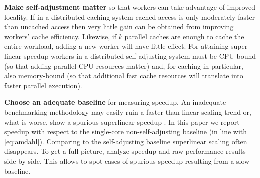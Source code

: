 \noindent%
\textbf{Make self-adjustment matter} so that workers can take advantage of improved locality. If in a distributed caching system cached access is only moderately faster than uncached access then very little gain can be obtained from improving workers' cache efficiency. Likewise, if $k$ parallel caches are enough to cache the entire workload, adding a new worker will have little effect. For attaining super-linear speedup workers in a distributed self-adjusting system must be CPU-bound (so that adding parallel CPU resources matter) and, for caching in particular, also memory-bound (so that additional fast cache resources will translate into faster parallel execution).

\noindent%
\textbf{Choose an adequate baseline} for measuring speedup. An inadequate benchmarking methodology may easily ruin a faster-than-linear scaling trend or, what is worse, show a spurious superlinear speedup \cite{10.1145/2773212.2789974}. In this paper we report speedup with respect to the single-core non-self-adjusting baseline (in line with \eqref{eq:amdahl}). Comparing to the self-adjusting baseline superlinear scaling often disappears. To get a full picture, analyze speedup and raw performance results side-by-side. This allows to spot cases of spurious speedup resulting from a slow baseline.


